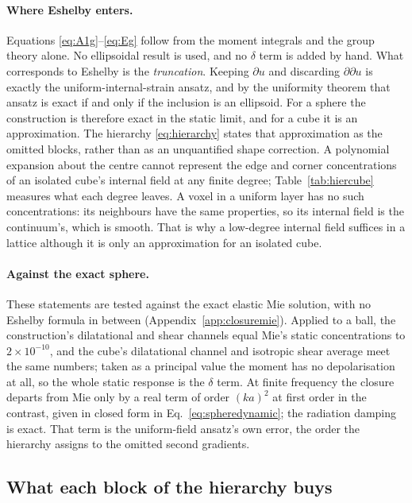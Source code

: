 \documentclass[11pt,a4paper]{article}
\begin{document}
\paragraph{Where Eshelby enters.} Equations \eqref{eq:A1g}--\eqref{eq:Eg} follow from the moment
integrals and the group theory alone. No ellipsoidal result is used, and no $\delta$ term is added
by hand. What corresponds to Eshelby is the \emph{truncation}. Keeping $\partial u$ and discarding
$\partial\partial u$ is exactly the uniform-internal-strain ansatz, and by the uniformity theorem
that ansatz is exact if and only if the inclusion is an ellipsoid. For a sphere the construction
is therefore exact in the static limit, and for a cube it is an approximation. The hierarchy
\eqref{eq:hierarchy} states that approximation as the omitted blocks, rather than as an
unquantified shape correction. A polynomial expansion about the centre cannot represent the edge
and corner concentrations of an isolated cube's internal field at any finite degree;
Table~\ref{tab:hiercube} measures what each degree leaves. A voxel in a
uniform layer has no such concentrations: its neighbours have the same properties, so its internal
field is the continuum's, which is smooth. That is why a low-degree internal field suffices in a
lattice \citep{NestorError2026} although it is only an approximation for an
isolated cube.

\paragraph{Against the exact sphere.} These statements are tested against the exact elastic Mie
solution, with no Eshelby formula in between (Appendix~\ref{app:closuremie}). Applied to a ball, the
construction's dilatational and shear channels equal Mie's static concentrations to $2\times10^{-10}$,
and the cube's dilatational channel and isotropic shear average meet the same numbers; taken as a
principal value the moment has no depolarisation at all, so the whole static response is the
$\delta$ term. At finite frequency the closure departs from Mie only by a real term of order $(ka)^2$
at first order in the contrast, given in closed form in Eq.~\eqref{eq:spheredynamic}; the radiation
damping is exact. That term is the uniform-field ansatz's own error, the order the hierarchy assigns
to the omitted second gradients.

\subsection{What each block of the hierarchy buys}\label{sec:blocks}
\end{document}
